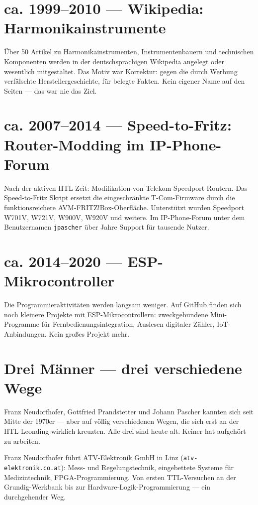 \documentclass[a4paper,12pt]{article}
\begin{document}
\section{ca. 1999--2010 --- Wikipedia: Harmonikainstrumente}

Über 50 Artikel zu Harmonikainstrumenten, Instrumentenbauern und technischen Komponenten werden in der deutschsprachigen Wikipedia angelegt oder wesentlich mitgestaltet. Das Motiv war Korrektur: gegen die durch Werbung verfälschte Herstellergeschichte, für belegte Fakten. Kein eigener Name auf den Seiten --- das war nie das Ziel.

\section{ca. 2007--2014 --- Speed-to-Fritz: Router-Modding im IP-Phone-Forum}

Nach der aktiven HTL-Zeit: Modifikation von Telekom-Speedport-Routern. Das \glqq Speed-to-Fritz Skript\grqq{} ersetzt die eingeschränkte T-Com-Firmware durch die funktionsreichere AVM-FRITZ!Box-Oberfläche. Unterstützt wurden Speedport W701V, W721V, W900V, W920V und weitere. Im IP-Phone-Forum unter dem Benutzernamen \texttt{jpascher} über Jahre Support für tausende Nutzer.

\section{ca. 2014--2020 --- ESP-Mikrocontroller}

Die Programmieraktivitäten werden langsam weniger. Auf GitHub finden sich noch kleinere Projekte mit ESP-Mikrocontrollern: zweckgebundene Mini-Programme für Fernbedienungsintegration, Auslesen digitaler Zähler, IoT-Anbindungen. Kein großes Projekt mehr.

\section{Drei Männer --- drei verschiedene Wege}

Franz Neudorfhofer, Gottfried Prandstetter und Johann Pascher kannten sich seit Mitte der 1970er --- aber auf völlig verschiedenen Wegen, die sich erst an der HTL Leonding wirklich kreuzten. Alle drei sind heute alt. Keiner hat aufgehört zu arbeiten.

Franz Neudorfhofer führt ATV-Elektronik GmbH in Linz (\texttt{atv-elektronik.co.at}): Mess- und Regelungstechnik, eingebettete Systeme für Medizintechnik, FPGA-Programmierung. Von ersten TTL-Versuchen an der Grundig-Werkbank bis zur Hardware-Logik-Programmierung --- ein durchgehender Weg.
\end{document}
